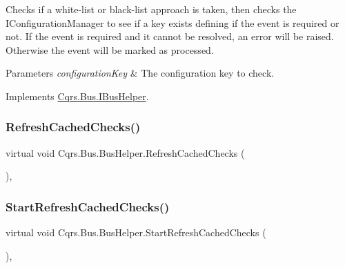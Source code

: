 Checks if a white-\/list or black-\/list approach is taken, then checks the I\+Configuration\+Manager to see if a key exists defining if the event is required or not. If the event is required and it cannot be resolved, an error will be raised. Otherwise the event will be marked as processed. 


\begin{DoxyParams}{Parameters}
{\em configuration\+Key} & The configuration key to check.\\
\hline
\end{DoxyParams}


Implements \hyperlink{interfaceCqrs_1_1Bus_1_1IBusHelper_af73d0d2aa8e98566acb4b2fb13a3e986_af73d0d2aa8e98566acb4b2fb13a3e986}{Cqrs.\+Bus.\+I\+Bus\+Helper}.

\mbox{\label{classCqrs_1_1Bus_1_1BusHelper_ad589391a51cd61673d2403ee8012e713_ad589391a51cd61673d2403ee8012e713}} 
\subsubsection{\texorpdfstring{Refresh\+Cached\+Checks()}{RefreshCachedChecks()}}
{\footnotesize\ttfamily virtual void Cqrs.\+Bus.\+Bus\+Helper.\+Refresh\+Cached\+Checks (\begin{DoxyParamCaption}{ }\end{DoxyParamCaption})\hspace{0.3cm}{\ttfamily [protected]}, {\ttfamily [virtual]}}

\mbox{\label{classCqrs_1_1Bus_1_1BusHelper_a23bfab1be70af651cc48033fcdf4ce2c_a23bfab1be70af651cc48033fcdf4ce2c}} 
\subsubsection{\texorpdfstring{Start\+Refresh\+Cached\+Checks()}{StartRefreshCachedChecks()}}
{\footnotesize\ttfamily virtual void Cqrs.\+Bus.\+Bus\+Helper.\+Start\+Refresh\+Cached\+Checks (\begin{DoxyParamCaption}{ }\end{DoxyParamCaption})\hspace{0.3cm}{\ttfamily [protected]}, {\ttfamily [virtual]}}



